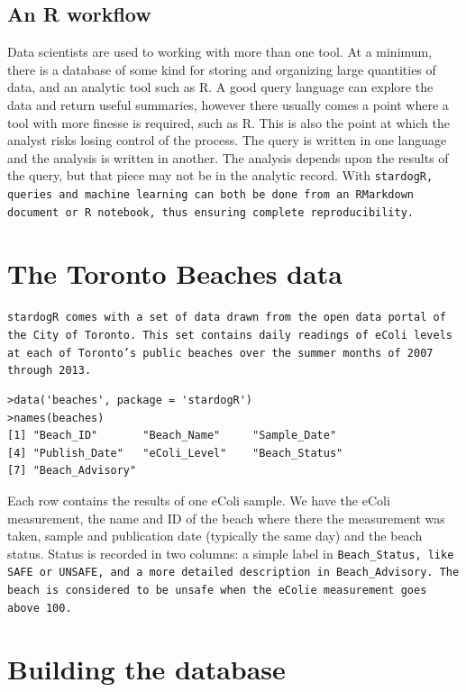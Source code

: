 \documentclass{article}\usepackage[]{graphicx}\usepackage[]{xcolor}
\begin{document}
\subsection{An R workflow}

Data scientists are used to working with more than one tool. At a minimum, there is a database of some kind for storing and organizing large quantities of data, and an analytic tool such as R. A good query language can explore the data and return useful summaries, however there usually comes a point where a tool with more finesse is required, such as R. This is also the point at which the analyst risks losing control of the process. The query is written in one language and the analysis is written in another. The analysis depends upon the results of the query, but that piece may not be in the analytic record. With \tt{stardogR}, queries and machine learning can both be done from an RMarkdown document or R notebook, thus ensuring complete reproducibility.



\section{The Toronto Beaches data}

\tt{stardogR} comes with a set of data drawn from the open data portal of the City of Toronto. This set contains daily readings of eColi levels at each of Toronto's public beaches over the summer months of 2007 through 2013.

\begin{verbatim}
>data('beaches', package = 'stardogR')
>names(beaches)
[1] "Beach_ID"       "Beach_Name"     "Sample_Date"
[4] "Publish_Date"   "eColi_Level"    "Beach_Status"
[7] "Beach_Advisory"
\end{verbatim}

Each row contains the results of one eColi sample. We have the eColi measurement, the name and ID of the beach where there the measurement was taken, sample and publication date (typically the same day) and the beach status. Status is recorded in two columns: a simple label in \tt{Beach\_Status}, like SAFE or UNSAFE, and a more detailed description in \tt{Beach\_Advisory}.  The beach is considered to be unsafe when the eColie measurement goes above 100.


\section{Building the database}
\end{document}
